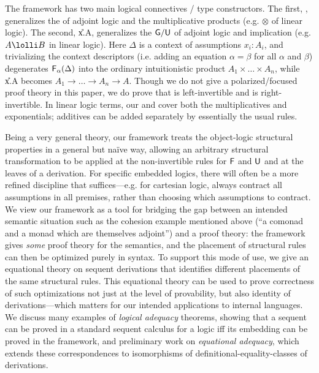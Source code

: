 The framework has two main logical connectives / type constructors.  The
first, \F{\alpha}{\Delta}, generalizes the  of adjoint logic and
the multiplicative products (e.g. $\otimes$ of linear logic).  The
second, \U{x.\alpha}{\Delta}{A}, generalizes the $\mathsf{G}/\mathsf{U}$ of
adjoint logic and implication (e.g. $A \lolli B$ in linear logic).  Here
$\Delta$ is a context of assumptions $x_i:A_i$, and trivializing the
context descriptors (i.e. adding an equation $\alpha = \beta$ for all
$\alpha$ and $\beta$) degenerates $\mathsf{F}_{\alpha}(\Delta)$ into the ordinary
intuitionistic product $A_1 \times \ldots \times A_n$, while
\U{x.\alpha}{\Delta}{A} becomes $A_1 \to \ldots \to A_n \to A$.  Though
we do not give a polarized/focused proof theory in this paper, we do
prove that  is left-invertible and  is right-invertible.
In linear logic terms, our  and  cover both the
multiplicatives and exponentials; additives can be added separately by
essentially the usual rules.

Being a very general theory, our framework treats the object-logic
structural properties in a general but na\"ive way, allowing an
arbitrary structural transformation to be applied at the non-invertible
rules for $\mathsf{F}$ and $\mathsf{U}$ and at the leaves of a derivation.
For specific embedded logics, there will often be a more refined
discipline that suffices---e.g. for cartesian logic, always contract all
assumptions in all premises, rather than choosing which assumptions to
contract.  We view our framework as a tool for bridging the gap between
an intended semantic situation such as the cohesion example mentioned
above (``a comonad and a monad which are themselves adjoint'') and a
proof theory: the framework gives \emph{some} proof theory for the
semantics, and the placement of structural rules can then be optimized
purely in syntax.  To support this mode of use, we give an equational
theory on sequent derivations that identifies different placements of
the same structural rules.  This equational theory can be used to prove
correctness of such optimizations not just at the level of provability,
but also identity of derivations---which matters for our intended
applications to internal languages.  We discuss many examples of
\emph{logical adequacy} theorems, showing that a sequent can be proved
in a standard sequent calculus for a logic iff its embedding can be
proved in the framework, and preliminary work on \emph{equational
  adequacy}, which extends these correspondences to isomorphisms of
definitional-equality-classes of derivations.

